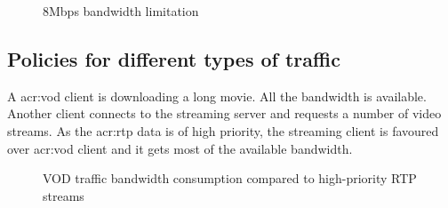 \documentclass[11pt]{book}
\begin{document}
        \begin{figure}[H]
          \centering


          \caption{8Mbps bandwidth limitation}
          \label{fig:uc:limit}
        \end{figure}


      \subsection{Policies for different types of traffic}
      \label{sub:uc:traffic}

        A \gls{acr:vod} client is downloading a long movie. All the bandwidth is available. Another client connects to the
        streaming server and requests a number of video streams. As the \gls{acr:rtp} data is of high priority, the streaming
        client is favoured over \gls{acr:vod} client and it gets most of the available bandwidth.

        \begin{figure}[H]
          \centering


          \caption{VOD traffic bandwidth consumption compared to high-priority RTP streams}
        \end{figure}
\end{document}
